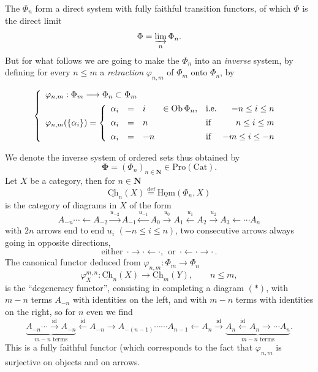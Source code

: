 \documentclass[11pt]{article}
\newcommand{\printedpage}[1]{\marginpar{\footnotesize p.~#1}}
\newcommand{\msp}[1]{\marginpar{\footnotesize [#1]}}
\newcommand{\Ob}{\operatorname{Ob}}
\newcommand{\uCh}{\underline{\mathrm{Ch}}}
\newcommand{\uHom}{\underline{\mathrm{Hom}}}
\newcommand{\bPhi}{\boldsymbol{\Phi}}
\begin{document}
\clearpage

\printedpage{2}

The $\Phi_n$ form a direct system with fully faithful transition functors, of which $\Phi$ is the direct limit
\[
\Phi=\varinjlim_n\Phi_n.
\]
But for what follows we are going to make the $\Phi_n$ into an \textit{inverse} system, by defining for every $n\le m$ a \textit{retraction} $\varphi_{n,m}$ of $\Phi_m$ onto $\Phi_n$, by

\msp{page 2}
\[
\left\{
\begin{array}{l}
\varphi_{n,m}:\Phi_m\longrightarrow\Phi_n\subset\Phi_m\\[1ex]
\varphi_{n,m}(\{\alpha_i\})=
\left\{
\begin{array}{rcll@{\quad}l@{\ \ }r}
\alpha_i & = & i & \in\Ob\Phi_n, & \text{i.e.} & -n\le i\le n\\[1ex]
\alpha_i & = & n & & \text{if} & n\le i\le m\\[1ex]
\alpha_i & = & -n & & \text{if} & -m\le i\le -n
\end{array}
\right.
\end{array}
\right.
\]

We denote the inverse system of ordered sets thus obtained by
\[
\bPhi=(\Phi_n)_{n\in\mathbf{N}}\in\mathrm{Pro}(\mathrm{Cat}).
\]
Let $X$ be a category, then for $n\in\mathbf{N}$
\[
\uCh_n(X)\overset{\text{def}}{=}\uHom(\Phi_n,X)
\]
is the category of diagrams in $X$ of the form
\[
A_{-n}\cdots\longleftarrow A_{-2}\xrightarrow{u_{-2}}A_{-1}\xleftarrow{u_{-1}}A_0\xrightarrow{u_0}A_1\xleftarrow{u_1}A_2\xrightarrow{u_2}A_3\longleftarrow\cdots A_n
\tag*{$(*)$}
\]
with $2n$ arrows end to end $u_i$ $(-n\le i\le n)$, two consecutive arrows always going in opposite directions,
\[
\text{either}\ \ \cdot\longrightarrow\cdot\longleftarrow\cdot,\ \ \text{or}\ \ \cdot\longleftarrow\cdot\longrightarrow\cdot\,.
\]
The canonical functor deduced from $\varphi_{n,m}:\Phi_m\longrightarrow\Phi_n$
\[
\varphi_X^{m,n}:\uCh_n(X)\longrightarrow\uCh_m(Y),\qquad n\le m,
\]
\printedpage{3}
 is the ``degeneracy functor'', consisting in completing a diagram $(*)$, with $m-n$ terms $A_{-n}$ with identities on the left, and with $m-n$ terms with identities on the right, so for $n$ even we find
\[
\underbrace{A_{-n}\cdots\xrightarrow{\text{id}}A_{-n}}_{m-n\text{ terms}}\xleftarrow{\text{id}}A_{-n}\longrightarrow A_{-(n-1)}\cdots\cdots A_{n-1}\longleftarrow A_n\xrightarrow{\text{id}}\underbrace{A_n\xleftarrow{\text{id}}A_n\longrightarrow\cdots A_n}_{m-n\text{ terms}}.
\]
This is a fully faithful functor (which corresponds to the fact that $\varphi_{n,m}$ is surjective on objects and on arrows. %
\end{document}
